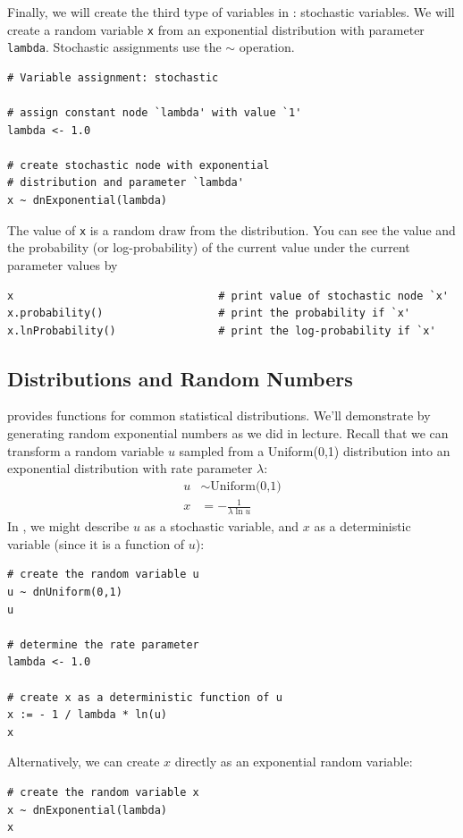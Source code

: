 Finally, we will create the third type of variables in \Rev: stochastic variables.
We will create a random variable \texttt{x} from an exponential distribution with parameter \texttt{lambda}.  
Stochastic assignments use the $\sim$ operation.
{\tt \begin{snugshade*}
\begin{lstlisting}     
# Variable assignment: stochastic

# assign constant node `lambda' with value `1'
lambda <- 1.0

# create stochastic node with exponential 
# distribution and parameter `lambda'
x ~ dnExponential(lambda)
\end{lstlisting}
\end{snugshade*}}
The value of \texttt{x} is a random draw from the distribution. 
You can see the value and the probability (or log-probability) of the current value under the current parameter values by
{\tt \begin{snugshade*}
\begin{lstlisting}    
x                                # print value of stochastic node `x'
x.probability()                  # print the probability if `x'
x.lnProbability()                # print the log-probability if `x'
\end{lstlisting}
\end{snugshade*}}



\subsection{Distributions and Random Numbers}

\Rev provides functions for common statistical distributions.
We'll demonstrate by generating random exponential numbers as we did in lecture.
Recall that we can transform a random variable $u$ sampled from a Uniform(0,1) distribution into an exponential distribution with rate parameter $\lambda$:
\begin{align*}
	u &\sim \text{Uniform(0,1)}\\
	x &= -\frac{1}{\lambda \ln u}
\end{align*}
In \Rev, we might describe $u$ as a stochastic variable, and $x$ as a deterministic variable (since it is a function of $u$):
{\tt \begin{snugshade*}
\begin{lstlisting}
# create the random variable u
u ~ dnUniform(0,1)
u

# determine the rate parameter
lambda <- 1.0

# create x as a deterministic function of u
x := - 1 / lambda * ln(u)
x
\end{lstlisting}
\end{snugshade*}}
\noindent Alternatively, we can create $x$ directly as an exponential random variable:
{\tt \begin{snugshade*}
\begin{lstlisting}
# create the random variable x
x ~ dnExponential(lambda)
x
\end{lstlisting}
\end{snugshade*}}



